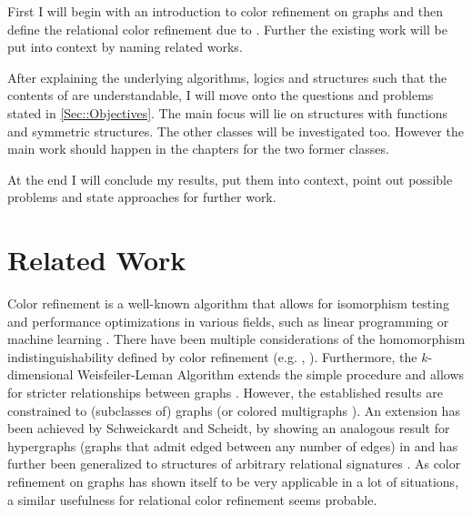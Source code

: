 \documentclass[a4paper,11pt,DIV=15]{scrartcl} %
\theoremstyle{plain}
\theoremstyle{definition}
\begin{document}
First I will begin with an introduction to color refinement on graphs and then define the relational color refinement due to \cite{scheidt2024color}.
Further the existing work will be put into context by naming related works.

After explaining the underlying algorithms, logics and structures such that the contents of \cite{scheidt2024color} are understandable, I will move onto the questions and problems stated in \cref{Sec::Objectives}.
The main focus will lie on structures with functions and symmetric structures.
The other classes will be investigated too. However the main work should happen in the chapters for the two former classes.

At the end I will conclude my results, put them into context, point out possible problems and state approaches for further work.


\section{Related Work}

Color refinement is a well-known algorithm that allows for isomorphism testing and performance optimizations in various fields, such as linear programming or machine learning \cite{grohe2021color}.
There have been multiple considerations of the homomorphism indistinguishability defined by color refinement (e.g. \cite{fluck2023going}, \cite{manvcinska2020quantum}).
Furthermore, the $k$-dimensional Weisfeiler-Leman Algorithm extends the simple procedure and allows for stricter relationships between graphs \cite{kiefer2020power}.
However, the established results are constrained to (subclasses of) graphs (or colored multigraphs \cite{dell2018lov}).
An extension has been achieved by Schweickardt and Scheidt, by showing an analogous result for hypergraphs (graphs that admit edged between any number of edges) in \cite{scheidt2023counting} and has further been generalized to structures of arbitrary relational signatures \cite{scheidt2024color}.
As color refinement on graphs has shown itself to be very applicable in a lot of situations, a similar usefulness for relational color refinement seems probable.




\end{document}
